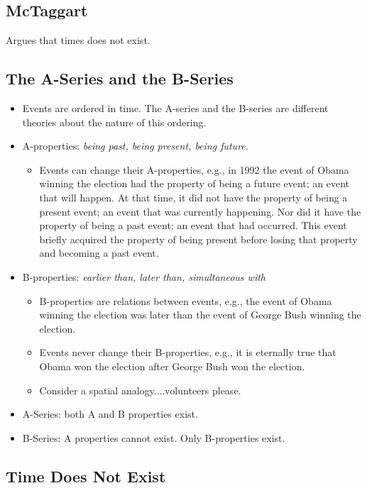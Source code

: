 \documentclass[oneside]{article}
\begin{document}
\thispagestyle{fancy}

\subsection*{McTaggart}
Argues that times does not exist. 

\subsection*{The A-Series and the B-Series}

\begin{itemize}
\item Events are ordered in time. The A-series and the B-series are different theories about the nature of this ordering. 
\item A-properties: \emph{being past, being present, being future}.
\begin{itemize}
\item Events can change their A-properties, e.g., in 1992 the event of Obama winning the election had the property of being a future event; an event that will happen. At that time, it did not have the property of being a present event; an event that was currently happening. Nor did it have the property of being a past event; an event that had occurred. This event briefly acquired the property of being present before losing that property and becoming a past event. 
\end{itemize}
\item B-properties: \emph{earlier than, later than, simultaneous with}
\begin{itemize}
\item B-properties are relations between events, e.g., the event of Obama winning the election was later than the event of George Bush winning the election.
\item Events never change their B-properties, e.g., it is eternally true that Obama won the election after George Bush won the election.
\item Consider a spatial analogy....volunteers please.
\end{itemize}
\item A-Series: both A and B properties exist. 
\item B-Series: A properties cannot exist. Only B-properties exist. 
\end{itemize}


\subsection*{Time Does Not Exist}
\end{document}
